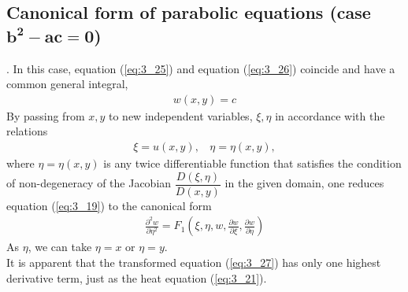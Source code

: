 \documentclass[11pt]{report}
\newcommand{\sps}{\\[0.2cm]}
\newcommand{\refn}[1]{(\ref{#1})}
\newcommand{\refx}[1]{\refn{eq:#1}}
\begin{document}
	\subsection{Canonical form of parabolic equations (case $\mathbf{b^2-ac = 0}$)}.
	In this case, equation \refx{3_25} and equation \refx{3_26} coincide and have a common general integral,
	\begin{eqnarray*}
		w(x,y) = c
	\end{eqnarray*}
	By passing from $x,y$ to new independent variables, $\xi, \eta$ in accordance with the relations
	\begin{eqnarray*}
		\xi = u(x,y),~~~~ \eta = \eta(x,y),
	\end{eqnarray*}
	where $\eta=\eta(x,y)$ is any twice differentiable function that satisfies the condition of non-degeneracy of the Jacobian $\dfrac{D(\xi,\eta)}{D(x,y)}$ in the given domain, one reduces equation \refx{3_19} to the canonical form
	\begin{eqnarray}
		\frac{\partial^2 w}{\partial\eta^2} = F_1\left(\xi,\eta,w,\frac{\partial w}{\partial\xi}, \frac{\partial w}{\partial\eta}\right) \label{eq:3_27}
	\end{eqnarray}
	As $\eta$, we can take $\eta =x$ or $\eta=y$.\sps
	It is apparent that the transformed equation \refx{3_27} has only one highest derivative term, just as the heat equation
	\refx{3_21}.\sps
	
\end{document}
